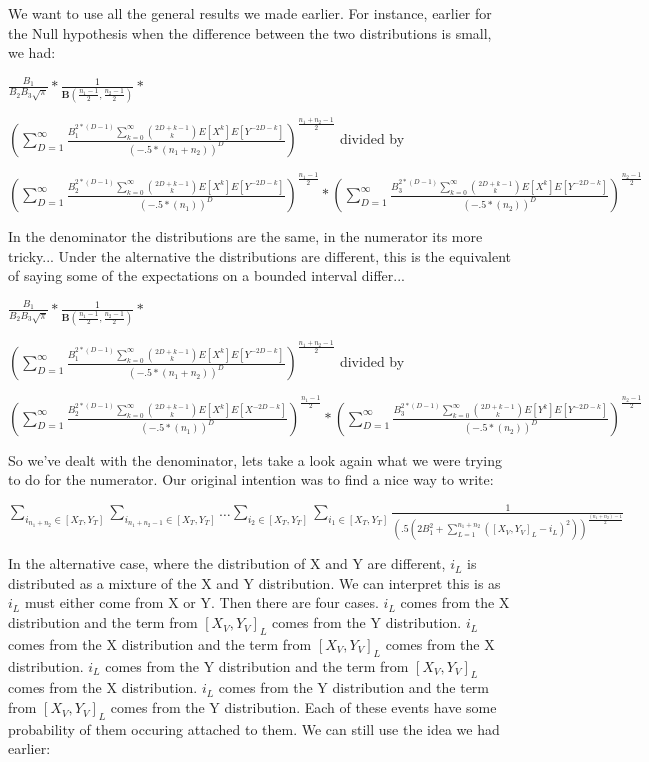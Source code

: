 \documentclass[11pt]{article}
\begin{document}
We want to use all the general results we made earlier. For instance, earlier for the Null hypothesis when the difference between the two distributions is small, we had:

$\frac{B_1}{B_2B_3 \sqrt{\pi}} * \frac{1}{ \mathbf{B}(\frac{n_1 -1}{2}, \frac{n_2 -1}{2})} * $

$(\sum_{D=1}^\infty \frac{B_1^{2*(D-1)}\sum_{k=0}^{\infty} \binom{2D+k-1}{k}E[{X^k}]E[{Y^{-2D-k}}]}{(-.5*(n_1+n_2))^{D}})^{\frac{{n_1 + n_2}-1}{2}}$ divided by

$(\sum_{D=1}^\infty \frac{B_2^{2*(D-1)}\sum_{k=0}^{\infty} \binom{2D+k-1}{k}E[{X^k}]E[{Y^{-2D-k}}]}{(-.5*(n_1))^{D}})^{\frac{{n_1}-1}{2}} * (\sum_{D=1}^\infty \frac{B_3^{2*(D-1)}\sum_{k=0}^{\infty}  \binom{2D+k-1}{k}E[{X^k}]E[{Y^{-2D-k}}]}{(-.5*(n_2))^{D}})^{\frac{{n_2}-1}{2}}$

In the denominator the distributions are the same, in the numerator its more tricky... Under the alternative the distributions are different, this is the equivalent of saying some of the expectations on a bounded interval differ...

$\frac{B_1}{B_2B_3 \sqrt{\pi}} * \frac{1}{ \mathbf{B}(\frac{n_1 -1}{2}, \frac{n_2 -1}{2})} * $

$(\sum_{D=1}^\infty \frac{B_1^{2*(D-1)}\sum_{k=0}^{\infty} \binom{2D+k-1}{k}E[{X^k}]E[{Y^{-2D-k}}]}{(-.5*(n_1+n_2))^{D}})^{\frac{{n_1 + n_2}-1}{2}}$ divided by

$(\sum_{D=1}^\infty \frac{B_2^{2*(D-1)}\sum_{k=0}^{\infty} \binom{2D+k-1}{k}E[{X^k}]E[{X^{-2D-k}}]}{(-.5*(n_1))^{D}})^{\frac{{n_1}-1}{2}} * (\sum_{D=1}^\infty \frac{B_3^{2*(D-1)}\sum_{k=0}^{\infty}  \binom{2D+k-1}{k}E[{Y^k}]E[{Y^{-2D-k}}]}{(-.5*(n_2))^{D}})^{\frac{{n_2}-1}{2}}$

So we've dealt with the denominator, lets take a look again what we were trying to do for the numerator. Our original intention was to find a nice way to write:

$\sum_{i_{n_1+n_2} \in [X_T, Y_T]} \sum_{i_{n_1+n_2-1}\in [X_T, Y_T]} \ldots  \sum_{i_{2}\in [X_T, Y_T]} \sum_{i_{1}\in [X_T, Y_T]} \frac{1}{(.5(2B_1^2 +  \sum_{L=1}^{n_1+n_2} ([X_V, Y_V]_{L} - i_L)^2))^{\frac{(n_1+n_2)-1}{2}}} $

In the alternative case, where the distribution of X and Y are different, $i_L$ is distributed as a mixture of the X and Y distribution. We can interpret this is as $i_L$ must either come from X or Y. Then there are four cases. $i_L$ comes from the X distribution and the term from $[X_V, Y_V]_{L}$ comes from the Y distribution. $i_L$ comes from the X distribution and the term from $[X_V, Y_V]_{L}$ comes from the X distribution. $i_L$ comes from the Y distribution and the term from $[X_V, Y_V]_{L}$ comes from the X distribution. $i_L$ comes from the Y distribution and the term from $[X_V, Y_V]_{L}$ comes from the Y distribution. Each of these events have some probability of them occuring attached to them. We can still use the idea we had earlier:
\end{document}
